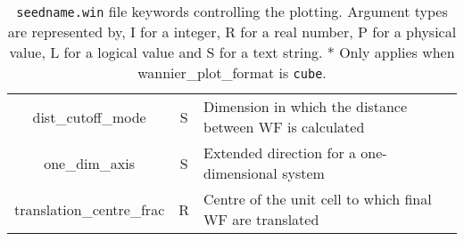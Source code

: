 \begin{table}
\begin{center}
\begin{tabular}{|c|c|p{6cm}|}
{\sc dist\_cutoff\_mode} & S & Dimension in which the distance between WF
is calculated \\
{\sc one\_dim\_axis} & S &  Extended direction for a one-dimensional system \\
{\sc translation\_centre\_frac } & R & Centre of the unit cell to which
final WF are translated \\ 
\hline
\end{tabular}
\caption[Parameter file keywords controlling plotting.]
{{\tt seedname.win} file keywords controlling the  plotting.  Argument types
are represented by, I for a integer, R for a real number, P for a
physical value, L for a logical value and S for a text string. * Only
applies when {\sc wannier\_plot\_format} is {\tt cube}.}
\label{parameter_keywords6}
\end{center}
\end{table}



